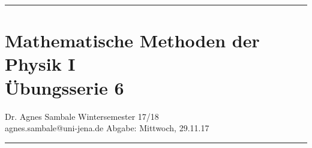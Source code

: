 \documentclass[a4paper,fleqn, 10pt]{article}
\begin{document}
	\pagestyle{empty}

	\hrule
	\section*{\centering Mathematische Methoden der Physik I \\ Übungsserie 6}
	\medskip
	Dr. Agnes Sambale \hfill Wintersemester 17/18\\
	agnes.sambale@uni-jena.de \hfill Abgabe: Mittwoch, 29.11.17
	\bigskip
	\hrule
	\bigskip
	\bigskip

	\atiShowSolutionsfalse

	
	\bigskip
	
	\bigskip
	




\end{document}
